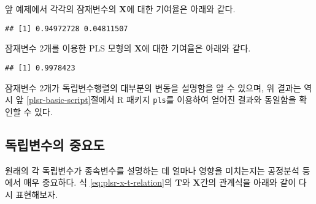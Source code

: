 \documentclass[]{book}
\newenvironment{Shaded}{\begin{snugshade}}{\end{snugshade}}
\newcommand{\KeywordTok}[1]{\textcolor[rgb]{0.13,0.29,0.53}{\textbf{#1}}}
\newcommand{\NormalTok}[1]{#1}
\newcommand{\OperatorTok}[1]{\textcolor[rgb]{0.81,0.36,0.00}{\textbf{#1}}}
\newcommand{\StringTok}[1]{\textcolor[rgb]{0.31,0.60,0.02}{#1}}
\begin{document}
앞 예제에서 각각의 잠재변수의 \(\mathbf{X}\)에 대한 기여율은 아래와 같다.

\begin{Shaded}
\end{Shaded}

\begin{verbatim}
## [1] 0.94972728 0.04811507
\end{verbatim}

잠재변수 2개를 이용한 PLS 모형의 \(\mathbf{X}\)에 대한 기여율은 아래와 같다.

\begin{Shaded}
\end{Shaded}

\begin{verbatim}
## [1] 0.9978423
\end{verbatim}

잠재변수 2개가 독립변수행렬의 대부분의 변동을 설명함을 알 수 있으며, 위 결과는 역시 앞 \ref{plsr-basic-script}절에서 R 패키지 \texttt{pls}를 이용하여 얻어진 결과와 동일함을 확인할 수 있다.

\hypertarget{plsr-variable-importance}{%
\subsection{독립변수의 중요도}\label{plsr-variable-importance}}

원래의 각 독립변수가 종속변수를 설명하는 데 얼마나 영향을 미치는지는 공정분석 등에서 매우 중요하다. 식 \eqref{eq:plsr-x-t-relation}의 \(\mathbf{T}\)와 \(\mathbf{X}\)간의 관계식을 아래와 같이 다시 표현해보자.
\end{document}

